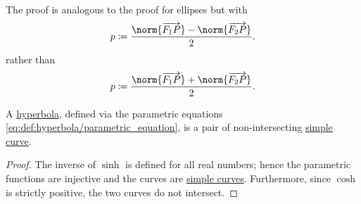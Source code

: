\begin{defproof}
   The proof is analogous to the proof for ellipses but with
  \begin{equation*}
    p \coloneqq \frac {\norm{\vect{F_1 P}} - \norm{\vect{F_2 P}}} 2.
  \end{equation*}
  rather than
  \begin{equation*}
    p \coloneqq \frac {\norm{\vect{F_1 P}} + \norm{\vect{F_2 P}}} 2.
  \end{equation*}
\end{defproof}

\begin{proposition}\label{thm:hyperbola_is_closed_simple_curve}
  A \hyperref[def:hyperbola]{hyperbola}, defined via the parametric equations \eqref{eq:def:hyperbola/parametric_equation}, is a pair of non-intersecting \hyperref[def:parametric_curve/simple]{simple curve}.
\end{proposition}
\begin{proof}
  The inverse of \( \sinh \) is defined for all real numbers; hence the parametric functions are injective and the curves are \hyperref[def:parametric_curve/simple]{simple curves}. Furthermore, since \( \cosh \) is strictly positive, the two curves do not intersect.
\end{proof}

